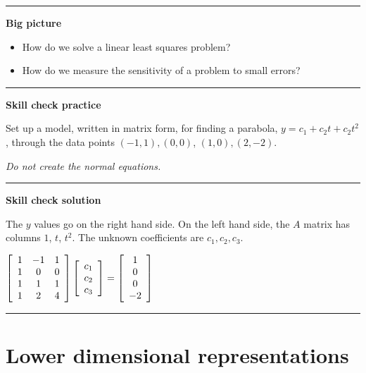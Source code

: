 \documentclass[12pt,letterpaper,noanswers]{exam}
\begin{document}
\hrule
\vspace{0.2cm}


\noindent\textbf{Big picture}
\begin{itemize}
    \itemsep0pt
\item How do we solve a linear least squares problem?
\item How do we measure the sensitivity of a problem to small errors?
\end{itemize}

\vspace{0.2cm}
\hrule
\vspace{0.2cm}

\noindent \textbf{Skill check practice}

Set up a model, written in matrix form, for finding a parabola, $y = c_1 + c_2 t + c_2 t^2$, through the data points $(-1,1), (0,0)$, $(1,0), (2,-2)$.

\emph{Do not create the normal equations.}



\vspace{0.2cm}
\hrule
\vspace{0.2cm}

\noindent \textbf{Skill check solution}

The $y$ values go on the right hand side.  On the left hand side, the $A$ matrix has columns $1$, $t$, $t^2$.  The unknown coefficients are $c_1, c_2, c_3$.

$\left[\begin{array}{c c c}1 & -1 & 1 \\
1 & 0 & 0 \\
1 & 1 & 1 \\
1 & 2 & 4\end{array}\right]\left[\begin{array}{c}c_1\\c_2\\c_3\end{array} \right]= \left[\begin{array}{c}1 \\ 0 \\ 0 \\ -2\end{array}\right]$


\vspace{0.2cm}
\hrule
\vspace{0.2cm}

\section{Lower dimensional representations}
\end{document}
